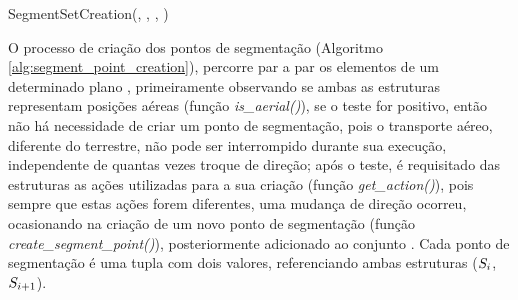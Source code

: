 \begin{algorithm}
  \caption[SegmentSetCreation]{SegmentSetCreation(\segmentpointset, , \originstate, \targetstate)}
  \label{alg:segment_creation}

  \begin{algorithmic}[1]


      \IF{$\segmentset = \emptyset$}
      \ELSE
      \ENDIF
    \ENDFOR

    \RETURN{\segmentset}

  \end{algorithmic}
\end{algorithm}

O processo de criação dos pontos de segmentação (Algoritmo \ref{alg:segment_point_creation}), percorre par a par os elementos de um determinado plano , primeiramente observando se ambas as estruturas representam posições aéreas (função \emph{is\_aerial()}), se o teste for positivo, então não há necessidade de criar um ponto de segmentação, pois o transporte aéreo, diferente do terrestre, não pode ser interrompido durante sua execução, independente de quantas vezes troque de direção; após o teste, é requisitado das estruturas as ações utilizadas para a sua criação (função \emph{get\_action()}), pois sempre que estas ações forem diferentes, uma mudança de direção ocorreu, ocasionando na criação de um novo ponto de segmentação (função \emph{create\_segment\_point()}), posteriormente adicionado ao conjunto \segmentpointset.
Cada ponto de segmentação é uma tupla com dois valores, referenciando ambas estruturas ($S_{i}$, $S_{i+1}$).

